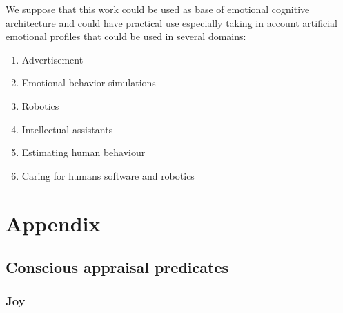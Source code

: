 We suppose that this work could be used as base of emotional cognitive architecture and could have practical use especially taking in account artificial emotional profiles that could be used in several domains:

\begin{enumerate}
\item  Advertisement
\item  Emotional behavior simulations
\item  Robotics
\item  Intellectual assistants
\item  Estimating human behaviour
\item  Caring for humans software and robotics
\end{enumerate}

\section{Appendix}

\subsection{Conscious appraisal predicates}

\subsubsection{Joy}

